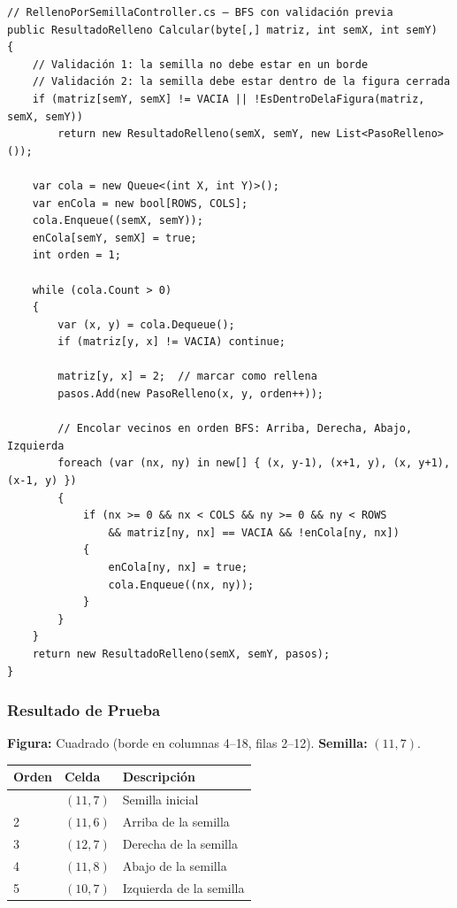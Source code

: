 \documentclass[
  spanish,
  a4paper,
  12pt,
]{article}
\newcounter{none} %
\begin{document}
\begin{lstlisting}
// RellenoPorSemillaController.cs — BFS con validación previa
public ResultadoRelleno Calcular(byte[,] matriz, int semX, int semY)
{
    // Validación 1: la semilla no debe estar en un borde
    // Validación 2: la semilla debe estar dentro de la figura cerrada
    if (matriz[semY, semX] != VACIA || !EsDentroDelaFigura(matriz, semX, semY))
        return new ResultadoRelleno(semX, semY, new List<PasoRelleno>());

    var cola = new Queue<(int X, int Y)>();
    var enCola = new bool[ROWS, COLS];
    cola.Enqueue((semX, semY));
    enCola[semY, semX] = true;
    int orden = 1;

    while (cola.Count > 0)
    {
        var (x, y) = cola.Dequeue();
        if (matriz[y, x] != VACIA) continue;

        matriz[y, x] = 2;  // marcar como rellena
        pasos.Add(new PasoRelleno(x, y, orden++));

        // Encolar vecinos en orden BFS: Arriba, Derecha, Abajo, Izquierda
        foreach (var (nx, ny) in new[] { (x, y-1), (x+1, y), (x, y+1), (x-1, y) })
        {
            if (nx >= 0 && nx < COLS && ny >= 0 && ny < ROWS
                && matriz[ny, nx] == VACIA && !enCola[ny, nx])
            {
                enCola[ny, nx] = true;
                cola.Enqueue((nx, ny));
            }
        }
    }
    return new ResultadoRelleno(semX, semY, pasos);
}
\end{lstlisting}

\newpage

\subsubsection{Resultado de Prueba}\label{resultado-de-prueba-6}

\textbf{Figura:} Cuadrado (borde en columnas 4--18, filas 2--12).
\textbf{Semilla:} \((11, 7)\).

{\def\LTcaptype{none} %
\begin{longtable}[]{@{}lll@{}}
\toprule\noalign{}
Orden & Celda & Descripción \\
\midrule\noalign{}
\endhead
\bottomrule\noalign{}
\endlastfoot
1 & \((11, 7)\) & Semilla inicial \\
2 & \((11, 6)\) & Arriba de la semilla \\
3 & \((12, 7)\) & Derecha de la semilla \\
4 & \((11, 8)\) & Abajo de la semilla \\
5 & \((10, 7)\) & Izquierda de la semilla \\
\end{longtable}
}
\end{document}
